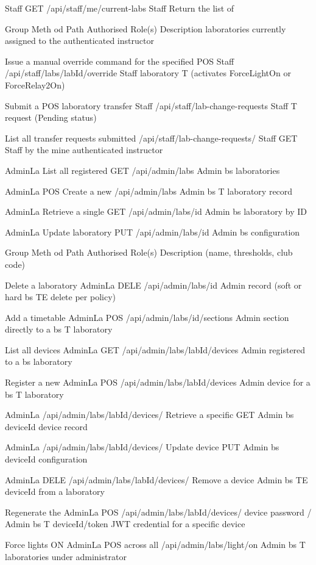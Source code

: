 Staff GET /api/staff/me/current-labs Staff Return the list of

Group Meth
od Path Authorised
Role(s) Description
laboratories
currently assigned
to the
authenticated
instructor

Issue a manual
override command
for the specified
POS
Staff /api/staff/labs/{labId}/override Staff laboratory
T
(activates
ForceLightOn or
ForceRelay2On)

Submit a
POS laboratory transfer
Staff /api/staff/lab-change-requests Staff
T request (Pending
status)

List all transfer
requests submitted
/api/staff/lab-change-requests/
Staff GET Staff by the
mine
authenticated
instructor

AdminLa List all registered
GET /api/admin/labs Admin
bs laboratories

AdminLa POS Create a new
/api/admin/labs Admin
bs T laboratory record

AdminLa Retrieve a single
GET /api/admin/labs/{id} Admin
bs laboratory by ID

AdminLa Update laboratory
PUT /api/admin/labs/{id} Admin
bs configuration


Group Meth
od Path Authorised
Role(s) Description
(name, thresholds,
club code)

Delete a laboratory
AdminLa DELE
/api/admin/labs/{id} Admin record (soft or hard
bs TE
delete per policy)

Add a timetable
AdminLa POS
/api/admin/labs/{id}/sections Admin section directly to a
bs T
laboratory

List all devices
AdminLa
GET /api/admin/labs/{labId}/devices Admin registered to a
bs
laboratory

Register a new
AdminLa POS
/api/admin/labs/{labId}/devices Admin device for a
bs T
laboratory

AdminLa /api/admin/labs/{labId}/devices/ Retrieve a specific
GET Admin
bs {deviceId} device record

AdminLa /api/admin/labs/{labId}/devices/ Update device
PUT Admin
bs {deviceId} configuration

AdminLa DELE /api/admin/labs/{labId}/devices/ Remove a device
Admin
bs TE {deviceId} from a laboratory

Regenerate the
AdminLa POS /api/admin/labs/{labId}/devices/ device password /
Admin
bs T {deviceId}/token JWT credential for
a specific device

Force lights ON
AdminLa POS across all
/api/admin/labs/light/on Admin
bs T laboratories under
administrator


